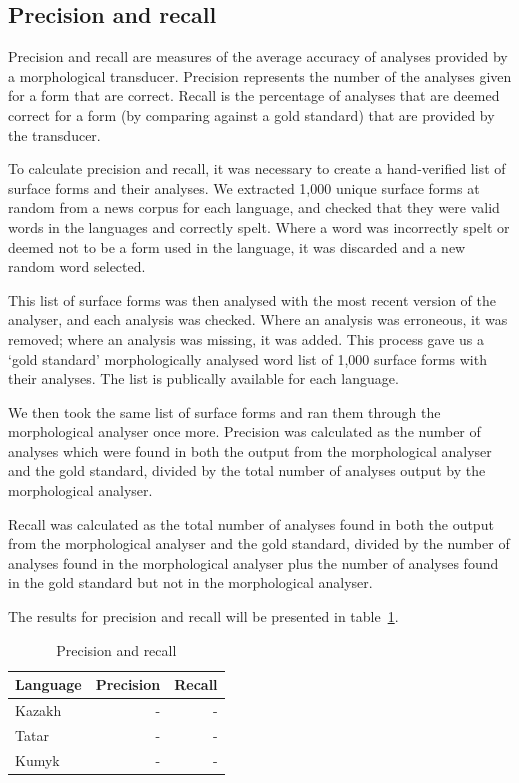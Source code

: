 \documentclass[a4paper,11pt,twocolumn]{article}
\begin{document}
\subsection{Precision and recall}

Precision and recall are measures of the average accuracy of analyses provided by a morphological transducer.  Precision represents the number of the analyses given for a form that are correct.  Recall is the percentage of analyses that are deemed correct for a form (by comparing against a gold standard) that are provided by the transducer.

To calculate precision and recall, it was necessary to create a hand-verified list of surface forms and their analyses.  We extracted 1,000 unique surface forms at random from a news corpus for each language, and checked that they were valid words in the languages and correctly spelt.  Where a word was incorrectly spelt or deemed not to be a form used in the language, it was discarded and a new random word selected.

This list of surface forms was then analysed with the most recent version of the analyser, and each analysis was checked.  Where an analysis was erroneous, it was removed; where an analysis was missing, it was added.  This process gave us a `gold standard' morphologically analysed word list of 1,000 surface forms with their analyses.  The list is publically available for each language.%

We then took the same list of surface forms and ran them through the morphological analyser once more.  Precision was calculated as the number of analyses which were found in both the output from the morphological analyser and the gold standard, divided by the total number of analyses output by the morphological analyser.

Recall was calculated as the total number of analyses found in both the output from the morphological analyser and the gold standard, divided by the number of analyses found in the morphological analyser plus the number of analyses found in the gold standard but not in the morphological analyser.

The results for precision and recall will be presented in table~\ref{table:precrecall}.


\begin{table}
\begin{center}
	\begin{tabular}{lrr}
	\toprule
		\textbf{Language} & \textbf{Precision} & \textbf{Recall} \\
	\midrule
		Kazakh & - &  - \\
		Tatar & - & - \\
		Kumyk & - & - \\
	\bottomrule
	\end{tabular}
	\caption{Precision and recall}
	\label{table:precrecall}
\end{center}
\end{table}
\end{document}
